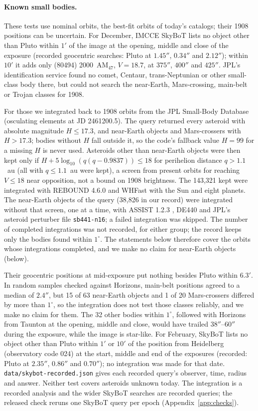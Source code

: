 \documentclass[11pt]{article}
\begin{document}
\begin{appendices}
\paragraph{Known small bodies.}
These tests use nominal orbits, the best-fit orbits of today's catalogs; their 1908 positions can be uncertain. For December, IMCCE SkyBoT \cite{Berthier2006} lists no object other than Pluto within $1'$ of the image at the opening, middle and close of the exposure (recorded geocentric searches: Pluto at $1.45''$, $0.34''$ and $2.12''$); within $10'$ it adds only (80494) 2000~AM$_{47}$, $V=18.7$, at $375''$, $400''$ and $425''$. JPL's identification service found no comet, Centaur, trans-Neptunian or other small-class body there, but could not search the near-Earth, Mars-crossing, main-belt or Trojan classes for 1908.

For those we integrated back to 1908 orbits from the JPL Small-Body Database \cite{SBDB} (osculating elements at JD 2461200.5). The query returned every asteroid with absolute magnitude $H\le17.3$, and near-Earth objects and Mars-crossers with $H>17.3$; bodies without $H$ fall outside it, so the code's fallback value $H=99$ for a missing $H$ is never used. Asteroids other than near-Earth objects were then kept only if $H+5\log_{10}(q(q-0.9837))\le18$ for perihelion distance $q>1.1$~au (all with $q\le1.1$~au were kept), a screen from present orbits for reaching $V\le18$ near opposition, not a bound on 1908 brightness. The 143,321 kept were integrated with REBOUND 4.6.0 \cite{Rein2012} and WHFast \cite{Rein2015} with the Sun and eight planets. The near-Earth objects of the query (38,826 in our record) were integrated without that screen, one at a time, with ASSIST 1.2.3 \cite{Holman2023}, DE440 \cite{Park2021} and JPL's asteroid perturber file \texttt{sb441-n16}; a failed integration was skipped. The number of completed integrations was not recorded, for either group; the record keeps only the bodies found within $1^\circ$. The statements below therefore cover the orbits whose integrations completed, and we make no claim for near-Earth objects (below).

Their geocentric positions at mid-exposure put nothing besides Pluto within $6.3'$. In random samples checked against Horizons, main-belt positions agreed to a median of $2.4''$, but 15 of 63 near-Earth objects and 1 of 20 Mars-crossers differed by more than $1^\circ$, so the integration does not test those classes reliably, and we make no claim for them. The 32 other bodies within $1^\circ$, followed with Horizons from Taunton at the opening, middle and close, would have trailed $38''$--$60''$ during the exposure, while the image is star-like. For February, SkyBoT lists no object other than Pluto within $1'$ or $10'$ of the position from Heidelberg (observatory code 024) at the start, middle and end of the exposures (recorded: Pluto at $2.35''$, $0.86''$ and $0.70''$); no integration was made for that date. \texttt{data/skybot-recorded.json} gives each recorded query's observer, time, radius and answer. Neither test covers asteroids unknown today. The integration is a recorded analysis and the wider SkyBoT searches are recorded queries; the released check reruns one SkyBoT query per epoch (Appendix~\ref{app:checks}).


\end{appendices}
\end{document}
